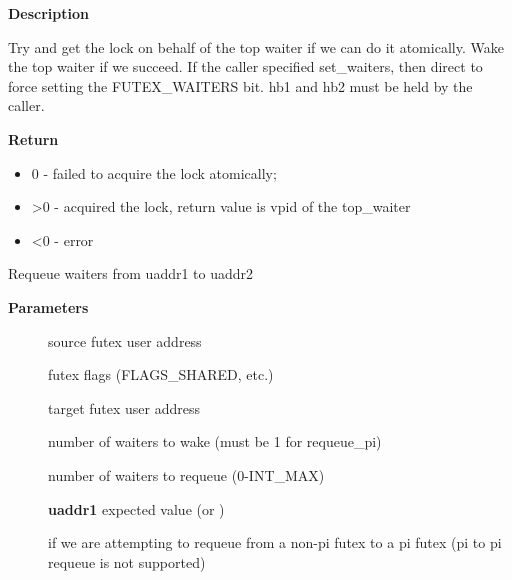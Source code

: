\documentclass[a4paper,8pt,english]{sphinxmanual}
\begin{document}
\textbf{Description}

Try and get the lock on behalf of the top waiter if we can do it atomically.
Wake the top waiter if we succeed.  If the caller specified set\_waiters,
then direct {\hyperref[kernel\string-hacking/locking:c.futex_lock_pi_atomic]{\emph{}}} to force setting the FUTEX\_WAITERS bit.
hb1 and hb2 must be held by the caller.

\textbf{Return}
\begin{itemize}
\item {} 
0 - failed to acquire the lock atomically;

\item {} 
\textgreater{}0 - acquired the lock, return value is vpid of the top\_waiter

\item {} 
\textless{}0 - error

\end{itemize}

\begin{fulllineitems}
\label{kernel-hacking/locking:c.futex_requeue}
Requeue waiters from uaddr1 to uaddr2

\end{fulllineitems}


\textbf{Parameters}
\begin{description}
\item[{}] \leavevmode
source futex user address

\item[{}] \leavevmode
futex flags (FLAGS\_SHARED, etc.)

\item[{}] \leavevmode
target futex user address

\item[{}] \leavevmode
number of waiters to wake (must be 1 for requeue\_pi)

\item[{}] \leavevmode
number of waiters to requeue (0-INT\_MAX)

\item[{}] \leavevmode
\textbf{uaddr1} expected value (or )

\item[{}] \leavevmode
if we are attempting to requeue from a non-pi futex to a
pi futex (pi to pi requeue is not supported)

\end{description}
\end{document}
